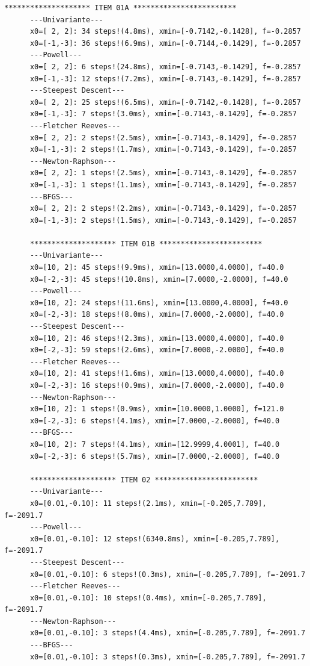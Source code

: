\documentclass[10pt, a4paper]{article}
\begin{document}
\begin{minipage}{\linewidth}
      \begin{lstlisting}[style=myStyle, caption=resultado da execu\c c\~ao do script, label=list_output]
      ******************** ITEM 01A ************************
      ---Univariante---
      x0=[ 2, 2]: 34 steps!(4.8ms), xmin=[-0.7142,-0.1428], f=-0.2857
      x0=[-1,-3]: 36 steps!(6.9ms), xmin=[-0.7144,-0.1429], f=-0.2857
      ---Powell---
      x0=[ 2, 2]: 6 steps!(24.8ms), xmin=[-0.7143,-0.1429], f=-0.2857
      x0=[-1,-3]: 12 steps!(7.2ms), xmin=[-0.7143,-0.1429], f=-0.2857
      ---Steepest Descent---
      x0=[ 2, 2]: 25 steps!(6.5ms), xmin=[-0.7142,-0.1428], f=-0.2857
      x0=[-1,-3]: 7 steps!(3.0ms), xmin=[-0.7143,-0.1429], f=-0.2857
      ---Fletcher Reeves---
      x0=[ 2, 2]: 2 steps!(2.5ms), xmin=[-0.7143,-0.1429], f=-0.2857
      x0=[-1,-3]: 2 steps!(1.7ms), xmin=[-0.7143,-0.1429], f=-0.2857
      ---Newton-Raphson---
      x0=[ 2, 2]: 1 steps!(2.5ms), xmin=[-0.7143,-0.1429], f=-0.2857
      x0=[-1,-3]: 1 steps!(1.1ms), xmin=[-0.7143,-0.1429], f=-0.2857
      ---BFGS---
      x0=[ 2, 2]: 2 steps!(2.2ms), xmin=[-0.7143,-0.1429], f=-0.2857
      x0=[-1,-3]: 2 steps!(1.5ms), xmin=[-0.7143,-0.1429], f=-0.2857

      ******************** ITEM 01B ************************
      ---Univariante---
      x0=[10, 2]: 45 steps!(9.9ms), xmin=[13.0000,4.0000], f=40.0
      x0=[-2,-3]: 45 steps!(10.8ms), xmin=[7.0000,-2.0000], f=40.0
      ---Powell---
      x0=[10, 2]: 24 steps!(11.6ms), xmin=[13.0000,4.0000], f=40.0
      x0=[-2,-3]: 18 steps!(8.0ms), xmin=[7.0000,-2.0000], f=40.0
      ---Steepest Descent---
      x0=[10, 2]: 46 steps!(2.3ms), xmin=[13.0000,4.0000], f=40.0
      x0=[-2,-3]: 59 steps!(2.6ms), xmin=[7.0000,-2.0000], f=40.0
      ---Fletcher Reeves---
      x0=[10, 2]: 41 steps!(1.6ms), xmin=[13.0000,4.0000], f=40.0
      x0=[-2,-3]: 16 steps!(0.9ms), xmin=[7.0000,-2.0000], f=40.0
      ---Newton-Raphson---
      x0=[10, 2]: 1 steps!(0.9ms), xmin=[10.0000,1.0000], f=121.0
      x0=[-2,-3]: 6 steps!(4.1ms), xmin=[7.0000,-2.0000], f=40.0
      ---BFGS---
      x0=[10, 2]: 7 steps!(4.1ms), xmin=[12.9999,4.0001], f=40.0
      x0=[-2,-3]: 6 steps!(5.7ms), xmin=[7.0000,-2.0000], f=40.0

      ******************** ITEM 02 ************************
      ---Univariante---
      x0=[0.01,-0.10]: 11 steps!(2.1ms), xmin=[-0.205,7.789], f=-2091.7
      ---Powell---
      x0=[0.01,-0.10]: 12 steps!(6340.8ms), xmin=[-0.205,7.789], f=-2091.7
      ---Steepest Descent---
      x0=[0.01,-0.10]: 6 steps!(0.3ms), xmin=[-0.205,7.789], f=-2091.7
      ---Fletcher Reeves---
      x0=[0.01,-0.10]: 10 steps!(0.4ms), xmin=[-0.205,7.789], f=-2091.7
      ---Newton-Raphson---
      x0=[0.01,-0.10]: 3 steps!(4.4ms), xmin=[-0.205,7.789], f=-2091.7
      ---BFGS---
      x0=[0.01,-0.10]: 3 steps!(0.3ms), xmin=[-0.205,7.789], f=-2091.7
      \end{lstlisting}
\end{minipage}



\end{document}
